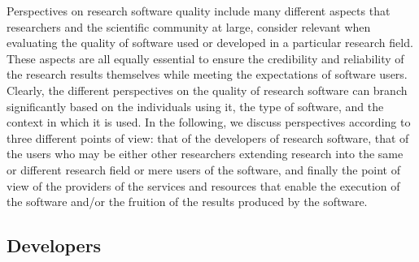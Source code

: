 Perspectives on research software quality include many different aspects that researchers and the scientific community at large, consider relevant when evaluating the quality of software used or developed in a particular research field. These aspects are all equally essential to ensure the credibility and reliability of the research results themselves while meeting the expectations of software users. Clearly, the different perspectives on the quality of research software can branch significantly based on the individuals using it, the type of software, and the context in which it is used. 
In the following, we discuss perspectives according to three different points of view: that of the developers of research software, that of the users who may be either other researchers extending research into the same or different research field or mere users of the software, and finally the point of view of the providers of the services and resources that enable the execution of the software and/or the fruition of the results produced by the software.  

\subsection{Developers}

